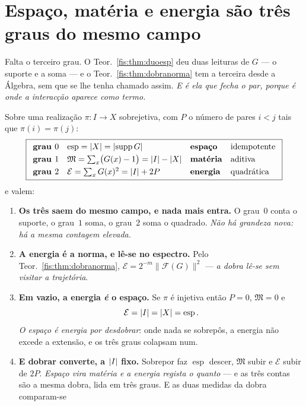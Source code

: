 \documentclass[livro.tex]{subfiles}
\begin{document}
\section{Espaço, matéria e energia são três graus do mesmo campo}\label{fis:topo-energia}

\noindent Falta o terceiro grau. O Teor.~\ref{fis:thm:duoesp} deu duas leituras
de $G$ --- o suporte e a soma --- e o Teor.~\ref{fis:thm:dobranorma} tem a
terceira desde a Álgebra, sem que se lhe tenha chamado assim. \emph{E é ela que
fecha o par, porque é onde a interacção aparece como termo.}

\begin{teorema}\label{fis:thm:tresgraus}
Sobre uma realização $\pi\colon I\to X$ sobrejetiva, com $P$ o número de pares
$i<j$ tais que $\pi(i)=\pi(j)$:
\[
\boxed{
\begin{array}{llll}
\textbf{grau }0 & \operatorname{esp}=\lvert X\rvert=\lvert \operatorname{supp}G\rvert & \text{\textbf{espaço}} & \text{idempotente}\\[3pt]
\textbf{grau }1 & \mathfrak{M}=\sum_x\bigl(G(x)-1\bigr)=\lvert I\rvert-\lvert X\rvert & \text{\textbf{matéria}} & \text{aditiva}\\[3pt]
\textbf{grau }2 & \mathcal{E}=\sum_x G(x)^{2}=\lvert I\rvert+2P & \text{\textbf{energia}} & \text{quadrática}
\end{array}}
\]
e valem:
\begin{enumerate}\itemsep3pt
\item[(1)] \textbf{Os três saem do mesmo campo, e nada mais entra.} O grau~$0$
conta o suporte, o grau~$1$ soma, o grau~$2$ soma o quadrado. \emph{Não há
grandeza nova: há a mesma contagem elevada.}
\item[(2)] \textbf{A energia é a norma, e lê-se no espectro.} Pelo
Teor.~\ref{fis:thm:dobranorma}, $\mathcal{E}=2^{-m}\lVert\mathcal{F}(G)\rVert^{2}$
--- \emph{a dobra lê-se sem visitar a trajetória}.
\item[(3)] \textbf{Em vazio, a energia \emph{é} o espaço.} Se $\pi$ é injetiva
então $P=0$, $\mathfrak{M}=0$ e
\[
\mathcal{E}=\lvert I\rvert=\lvert X\rvert=\operatorname{esp} .
\]
\emph{O espaço é energia por desdobrar}: onde nada se sobrepôs, a energia não
excede a extensão, e os três graus colapsam num.
\item[(4)] \textbf{E dobrar converte, a $\lvert I\rvert$ fixo.} Sobrepor faz
$\operatorname{esp}$ descer, $\mathfrak{M}$ subir e $\mathcal{E}$ subir de $2P$.
\emph{Espaço vira matéria e a energia regista o quanto} --- e as três contas são
a mesma dobra, lida em três graus. E as duas medidas da dobra comparam-se

\end{enumerate}
\end{teorema}
\end{document}
